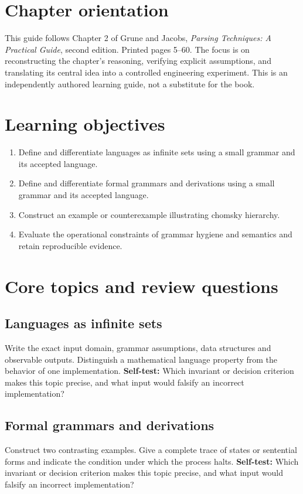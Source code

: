 \documentclass[11pt,letterpaper]{article}
\begin{document}
\makedoctitle\makedocsummary
\tableofcontents\clearpage
\section{Chapter orientation}
This guide follows Chapter 2 of Grune and Jacobs, \emph{Parsing Techniques: A Practical Guide}, second edition. Printed pages 5--60. The focus is on reconstructing the chapter's reasoning, verifying explicit assumptions, and translating its central idea into a controlled engineering experiment. This is an independently authored learning guide, not a substitute for the book.
\section{Learning objectives}
\begin{enumerate}
\item Define and differentiate languages as infinite sets using a small grammar and its accepted language.
\item Define and differentiate formal grammars and derivations using a small grammar and its accepted language.
\item Construct an example or counterexample illustrating chomsky hierarchy.
\item Evaluate the operational constraints of grammar hygiene and semantics and retain reproducible evidence.
\end{enumerate}
\section{Core topics and review questions}
\subsection{Languages as infinite sets}
Write the exact input domain, grammar assumptions, data structures and observable outputs. Distinguish a mathematical language property from the behavior of one implementation.
\textbf{Self-test:} Which invariant or decision criterion makes this topic precise, and what input would falsify an incorrect implementation?
\subsection{Formal grammars and derivations}
Construct two contrasting examples. Give a complete trace of states or sentential forms and indicate the condition under which the process halts.
\textbf{Self-test:} Which invariant or decision criterion makes this topic precise, and what input would falsify an incorrect implementation?
\end{document}

